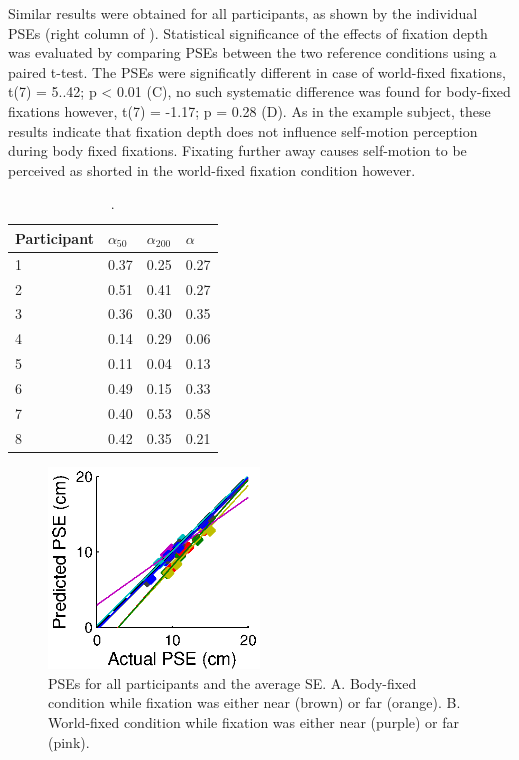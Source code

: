 Similar results were obtained for all participants, as shown by the individual PSEs (right column of ). Statistical significance of the effects of fixation depth was evaluated by comparing PSEs between the two reference conditions using a paired t-test. The PSEs were significatly different in case of world-fixed fixations, t(7) = 5..42; p < 0.01 (C), no such systematic difference was found for body-fixed fixations however, t(7) = -1.17; p = 0.28 (D). As in the example subject, these results indicate that fixation depth does not influence self-motion perception during body fixed fixations. Fixating further away causes self-motion to be perceived as shorted in the world-fixed fixation condition however.

\begin{table}
    \begin{tabular}{l|lll}
	Participant & $\alpha_{50}$ & $\alpha_{200}$ & $\alpha$ \\
    \hline
	1 & 0.37 & 0.25 & 0.27 \\
	2 & 0.51 & 0.41 & 0.27 \\
	3 & 0.36 & 0.30 & 0.35 \\
	4 & 0.14 & 0.29 & 0.06 \\
	5 & 0.11 & 0.04 & 0.13 \\
	6 & 0.49 & 0.15 & 0.33 \\
	7 & 0.40 & 0.53 & 0.58 \\
	8 & 0.42 & 0.35 & 0.21 \\
    \end{tabular}

    \caption{.}

    \label{p4:tab2}
\end{table}

\begin{figure}
    \includegraphics[width=0.5\textwidth]{src/paper4/paper4_figure4.eps}

	\caption{PSEs for all participants and the average \textpm SE. A.  Body-fixed condition while fixation was either near (brown) or far (orange). B. World-fixed condition while fixation was either near (purple) or far (pink).}
	\label{p4:fig4}
\end{figure}

